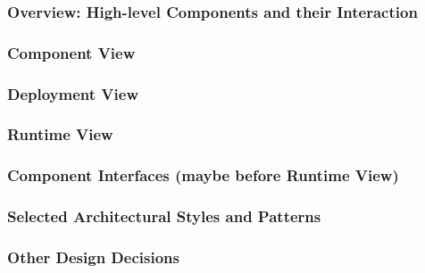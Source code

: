 \subsubsection{Overview: High-level Components and their Interaction}
\subsubsection{Component View}
\subsubsection{Deployment View}
\subsubsection{Runtime View}
\subsubsection{Component Interfaces (maybe before Runtime View)}
\subsubsection{Selected Architectural Styles and Patterns}
\subsubsection{Other Design Decisions}